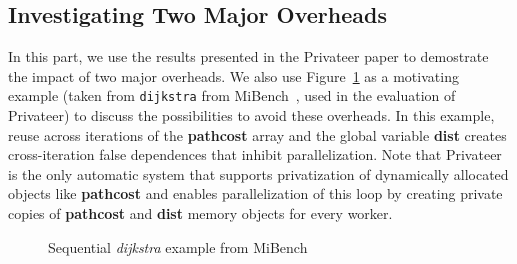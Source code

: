 \subsection{Investigating Two Major Overheads}
\label{motiv_overheads}
In this part, we use the results presented in the Privateer paper to
demostrate the impact of two major overheads. We also use
Figure~\ref{fig:dijkstra_motivation} as a motivating example (taken from
\texttt{dijkstra} from MiBench~\cite{}, used in the evaluation of
Privateer) to discuss the possibilities to avoid these overheads. In this
example, reuse across iterations of the \textbf{pathcost} array and the
global variable \textbf{dist} creates cross-iteration false dependences
that inhibit parallelization. Note that Privateer~\cite{Johnson:12:plid} is
the only automatic system that supports privatization of dynamically
allocated objects like \textbf{pathcost} and enables parallelization of
this loop by creating private copies of \textbf{pathcost} and \textbf{dist}
memory objects for every worker.

\lstset{basicstyle=\ttfamily, numbers=left, numberstyle=\tiny,
  stepnumber=1, numbersep=5pt}
\begin{figure}[t]
  \centering
  \scriptsize
    \subfloat{
    \begin{minipage}{5cm}
      
    \end{minipage}
%
%
%

%
%
%

}
\caption{Sequential \textit{dijkstra} example from MiBench~\cite{}}
\label{fig:dijkstra_motivation}
\end{figure}


